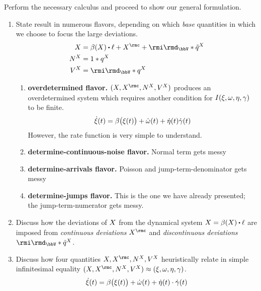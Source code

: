 \begin{enumerate}
    Perform the necessary calculus and proceed to show our general formulation.
    \begin{enumerate}
      \item
        State result in numerous flavors, depending on which \emph{base} quantities in which we choose to focus the large deviations.
          \begin{align*}
            \X &= \affDrift(\X)\shortInt \leb + \X^\rmc + \id_\vecSpace \ast \compensate{\jumpMeas^\X} \\
            \N^\X &= 1 \ast \jumpMeas^\X \\
            V^\X &= \id_\vecSpace \ast \jumpMeas^\X 
          \end{align*}
        \begin{enumerate}
          \item
            \textbf{overdetermined flavor.}
            $(\X, \X^\rmc, \N^\X, V^\X)$ produces an overdetermined system which requires another condition for $I(\xi, \omega, \eta, \gamma)$ to be finite.
            \[
              \dot{\xi}(t) = \beta\big(\xi(t)\big) + \dot\omega(t) + \dot\eta(t)\dot\gamma(t)
            \]
            However, the rate function is very simple to understand.
          \item
            \textbf{determine-continuous-noise flavor.}
            Normal term gets messy
          \item
            \textbf{determine-arrivals flavor.}
            Poisson and jump-term-denominator gets messy
          \item
            \textbf{determine-jumps flavor.}
            This is the one we have already presented; the jump-term-numerator gets messy.
        \end{enumerate}
      \item
        Discuss how the deviations of $X$ from the dynamical system $\X = \affDrift(\X) \shortInt \leb$ are imposed from \emph{continuous deviations} $\X^\rmc$ and \emph{discontinuous deviations} $\id_\vecSpace \ast \compensate{\jumpMeas^\X}$.
      \item
        Discuss how four quantities $\X, \X^\rmc, \N^\X, V^\X$ heuristically relate in simple infinitesimal equality $(\X, \X^\rmc, \N^\X, V^\X) \approx (\pathVar, \omega, \eta, \gamma)$.
        \begin{align*}
          \dot{\xi}(t) = \beta\big(\xi(t)\big) + \dot\omega(t) + \dot\eta(t) \cdot \dot\gamma(t)
        \end{align*}

\end{enumerate}
\end{enumerate}
